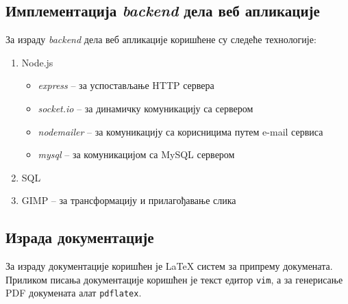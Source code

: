 \subsection{Имплементација \textit{backend} дела веб апликације}
За израду \textit{backend} дела веб апликације коришћене су
следеће технологије:
\begin{enumerate}
    \item Node.js
        \begin{itemize}
            \item \textit{express} -- за успостављање HTTP сервера
            \item \textit{socket.io} -- за динамичку комуникацију са сервером
            \item \textit{nodemailer} -- за комуникацију са корисницима путем e-mail сервиса
            \item \textit{mysql} -- за комуникацијом са MySQL сервером
        \end{itemize}
    \item SQL
    \item GIMP -- за трансформацију и прилагођавање слика
\end{enumerate}

\subsection{Израда документације}
За израду документације коришћен је LaTeX систем за
припрему докумената. Приликом писања документације
коришћен је текст едитор \texttt{vim}, а за генерисање
PDF докумената алат \texttt{pdflatex}.

